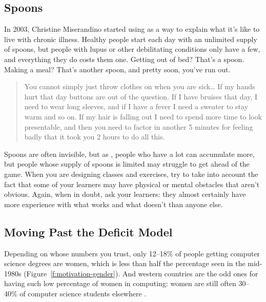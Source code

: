\subsection{Spoons}\label{spoons}

In 2003, Christine Miserandino started using
 as a way to explain what it's like to
live with chronic illness. Healthy people start each day with an
unlimited supply of spoons, but people with lupus or other
debilitating conditions only have a few, and everything they do costs
them one. Getting out of bed? That's a spoon. Making a meal? That's
another spoon, and pretty soon, you've run out.

\begin{quote}

You cannot simply just throw clothes on when you are
sick{\ldots} If my hands hurt that day buttons are out of the
question. If I have bruises that day, I need to wear long sleeves, and
if I have a fever I need a sweater to stay warm and so on. If my hair
is falling out I need to spend more time to look presentable, and then
you need to factor in another 5 minutes for feeling badly that it took
you 2 hours to do all this.

\end{quote}

Spoons are often invisible, but as , people who have a lot can accumulate more,
but people whose supply of spoons is limited may struggle to get ahead
of the game. When you are designing classes and exercises, try to take
into account the fact that some of your learners may have physical or
mental obstacles that aren't obvious. Again, when in doubt, ask your
learners: they almost certainly have more experience with what works
and what doesn't than anyone else.

\subsection{Moving Past the Deficit Model}\label{moving-past-the-deficit-model}

Depending on whose numbers you trust, only 12--18\% of people getting
computer science degrees are women, which is less than half the
percentage seen in the mid-1980s (Figure~\ref{f:motivation-gender}). And
western countries are the odd ones for having such low percentage of
women in computing: women are still often 30--40\% of computer science
students elsewhere \cite{Galp2002,Varm2015}.

